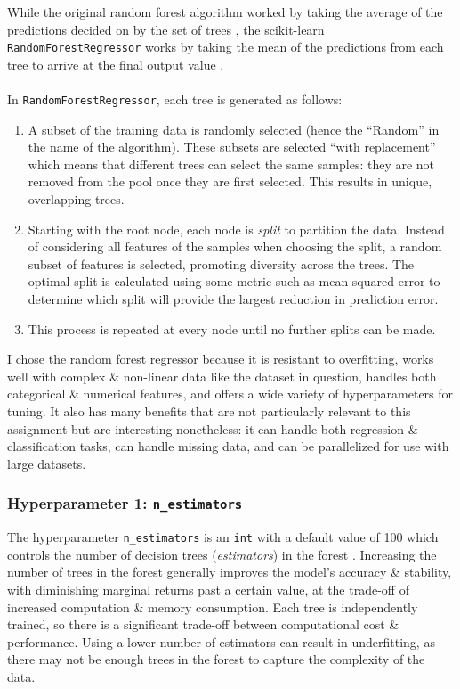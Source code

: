 \documentclass[a4paper, 10pt]{article}
\begin{document}
While the original random forest algorithm worked by taking the average of the predictions decided on by the set of trees \supercite{breiman}, the scikit-learn \texttt{RandomForestRegressor} works by taking the mean of the predictions from each tree to arrive at the final output value \supercite{scikit_ensembles}.
\\\\
In \texttt{RandomForestRegressor}, each tree is generated as follows:
\begin{enumerate}
    \item   A subset of the training data is randomly selected (hence the ``Random'' in the name of the algorithm).
            These subsets are selected ``with replacement'' which means that different trees can select the same samples: they are not removed from the pool once they are first selected.
            This results in unique, overlapping trees.

    \item   Starting with the root node, each node is \textit{split} to partition the data.
            Instead of considering all features of the samples when choosing the split, a random subset of features is selected, promoting diversity across the trees.
            The optimal split is calculated using some metric such as mean squared error to determine which split will provide the largest reduction in prediction error.

    \item This process is repeated at every node until no further splits can be made.
\end{enumerate}

I chose the random forest regressor because it is resistant to overfitting, works well with complex \& non-linear data like the dataset in question, handles both categorical \& numerical features, and offers a wide variety of hyperparameters for tuning.
It also has many benefits that are not particularly relevant to this assignment but are interesting nonetheless: it can handle both regression \& classification tasks, can handle missing data, and can be parallelized for use with large datasets.

\subsubsection{Hyperparameter 1: \texttt{n_estimators}}
The hyperparameter \texttt{n_estimators} is an \texttt{int} with a default value of 100 which controls the number of decision trees (\textit{estimators}) in the forest \supercite{scikit_randomforestregressor}.
Increasing the number of trees in the forest generally improves the model's accuracy \& stability, with diminishing marginal returns past a certain value, at the trade-off of increased computation \& memory consumption.
Each tree is independently trained, so there is a significant trade-off between computational cost \& performance.
Using a lower number of estimators can result in underfitting, as there may not be enough trees in the forest to capture the complexity of the data.
\end{document}

